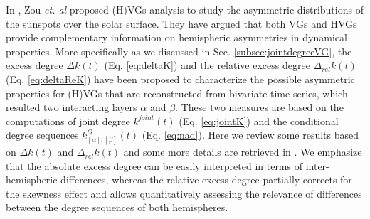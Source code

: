 		In \cite{Zou2014}, Zou {\textit{et. al}} proposed (H)VGs analysis to study the asymmetric distributions of the sunspots over the solar surface. They have argued that both VGs and HVGs provide complementary information on hemispheric asymmetries in dynamical properties. More specifically as we discussed in Sec. \ref{subsec:jointdegreeVG}, the excess degree $\Delta k(t)$ (Eq. \eqref{eq:deltaK}) and the relative excess degree $\Delta_{rel} k(t)$ (Eq. \eqref{eq:deltaReK}) have been proposed to characterize the possible asymmetric properties for (H)VGs that are reconstructed from bivariate time series, which resulted two interacting layers $\alpha$ and $\beta$. These two measures are based on the computations of joint degree $k^{joint}(t)$ (Eq. \ref{eq:jointK}) and the conditional degree sequences $k_{{[\alpha]}, {[\beta]}}^{O}(t)$ (Eq. \ref{eq:nad}). Here we review some results based on $\Delta k(t)$ and $\Delta_{rel} k(t)$ and some more details are retrieved in \cite{Zou2014}. We emphasize that the absolute excess degree can be easily interpreted in terms of inter-hemispheric differences, whereas the relative excess degree partially corrects for the skewness effect and allows quantitatively assessing the relevance of differences between the degree sequences of both hemispheres.

